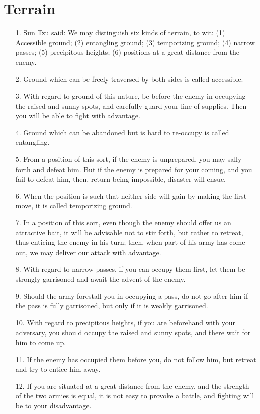 \documentclass[11pt,openany]{memoir}
\newcommand{\enumeratemargin}{1.30em}
\begin{document}
\chapter{Terrain}
\begin{enumerate}[leftmargin=\enumeratemargin]
\item[1.] Sun Tzu said: We may distinguish six kinds of terrain, to wit: (1) Accessible ground; (2) entangling ground; (3) temporizing ground; (4) narrow passes; (5) precipitous heights; (6) positions at a great distance from the enemy.
\item[2.] Ground which can be freely traversed by both sides is called accessible.
\item[3.] With regard to ground of this nature, be before the enemy in occupying the raised and sunny spots, and carefully guard your line of supplies. Then you will be able to fight with advantage.
\item[4.] Ground which can be abandoned but is hard to re-occupy is called entangling.
\item[5.] From a position of this sort, if the enemy is unprepared, you may sally forth and defeat him. But if the enemy is prepared for your coming, and you fail to defeat him, then, return being impossible, disaster will ensue.
\item[6.] When the position is such that neither side will gain by making the first move, it is called temporizing ground.
\item[7.] In a position of this sort, even though the enemy should offer us an attractive bait, it will be advisable not to stir forth, but rather to retreat, thus enticing the enemy in his turn; then, when part of his army has come out, we may deliver our attack with advantage.
\item[8.] With regard to narrow passes, if you can occupy them first, let them be strongly garrisoned and await the advent of the enemy.
\item[9.] Should the army forestall you in occupying a pass, do not go after him if the pass is fully garrisoned, but only if it is weakly garrisoned.
\item[10.] With regard to precipitous heights, if you are beforehand with your adversary, you should occupy the raised and sunny spots, and there wait for him to come up.
\item[11.] If the enemy has occupied them before you, do not follow him, but retreat and try to entice him away.
\item[12.] If you are situated at a great distance from the enemy, and the strength of the two armies is equal, it is not easy to provoke a battle, and fighting will be to your disadvantage.

\end{enumerate}
\end{document}

